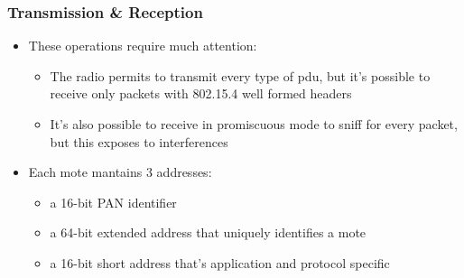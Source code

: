 \begin{frame}[fragile]
  \frametitle{Transmission \& Reception}
  \begin{itemize}
    \item These operations require much attention:
    \begin{itemize}
    	\item The radio permits to transmit every type of pdu, but it's possible to receive only packets with 802.15.4 well formed headers
    	\item It's also possible to receive in promiscuous mode to sniff for every packet, but this exposes to interferences
    \end{itemize}
    \item Each mote mantains 3 addresses:
    \begin{itemize}
    	\item a 16-bit PAN identifier
    	\item a 64-bit extended address that uniquely identifies a mote
    	\item a 16-bit short address that's application and protocol specific
    \end{itemize}
  \end{itemize}
\end{frame}

